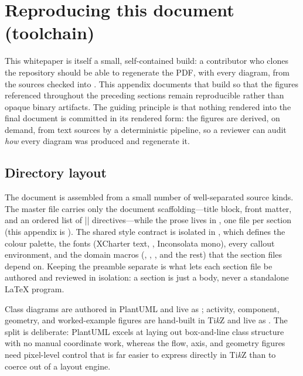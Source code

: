 \section{Reproducing this document (toolchain)}\label{sec:repro}

This whitepaper is itself a small, self-contained build: a contributor who clones the
repository should be able to regenerate the PDF, with every diagram, from the sources
checked into . This appendix documents that build so
that the figures referenced throughout the preceding sections remain reproducible rather
than opaque binary artifacts. The guiding principle is that nothing rendered into the final
document is committed in its rendered form: the figures are derived, on demand, from text
sources by a deterministic pipeline, so a reviewer can audit \emph{how} every diagram was
produced and regenerate it.

\subsection{Directory layout}

The document is assembled from a small number of well-separated source kinds. The master
file  carries only the document scaffolding---title block, front
matter, and an ordered list of \cppinline|| directives---while the prose lives in
, one file per section (this appendix is
). The shared style contract is isolated in
, which defines the colour palette, the fonts (XCharter text,
, Inconsolata mono), every callout environment, and the domain macros
(, , ,
and the rest) that the section files depend on. Keeping the preamble separate is what lets
each section file be authored and reviewed in isolation: a section is just a body, never a
standalone \LaTeX{} program.

\begin{designrule}
Class diagrams are authored in PlantUML and live as ; activity,
component, geometry, and worked-example figures are hand-built in Ti\emph{k}Z and live as
. The split is deliberate: PlantUML excels at laying out
box-and-line class structure with no manual coordinate work, whereas the flow, axis, and
geometry figures need pixel-level control that is far easier to express directly in
Ti\emph{k}Z than to coerce out of a layout engine.
\end{designrule}

